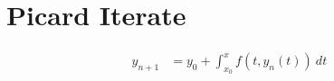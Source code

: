 \section{Picard Iterate}
	\begin{align}
		y_{n+1} &= y_{0} + \int_{x_{0}}^{x} f(t,y_{n}(t)) \ dt&
	\end{align}
